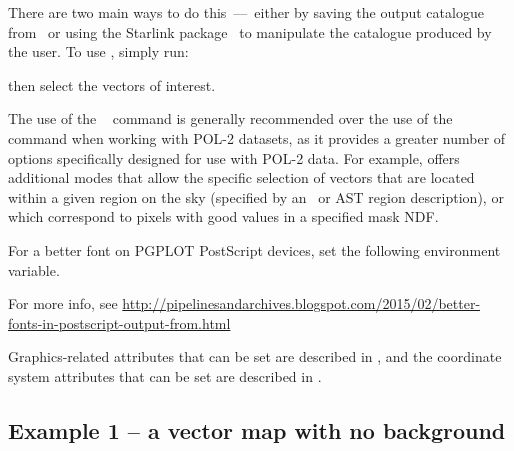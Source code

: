 There are two main ways to do this\ ---\ either by saving the output
catalogue from \GAIAref\ or using the Starlink package \POLPACKref\ to manipulate
the catalogue produced by the user.  To use \polpack, simply run:

\begin{terminalv}
\end{terminalv}

then select the vectors of interest.

\begin{terminalv}
\end{terminalv}

The use of the \POLPACKref\  command is
generally recommended over the use of the  
command when working with POL-2 datasets, as it provides a greater number of options
specifically designed for use with POL-2 data. For example,  offers
additional modes that allow the specific selection of vectors that are located within a given
region on the sky (specified by an \ARDref\ or AST region description), or which correspond to
pixels with good values in a specified mask NDF. 


\begin{tip}
  For a better font on PGPLOT PostScript devices, set the following
  environment variable.

\begin{terminalv}
\end{terminalv}

For more info, see
\url{http://pipelinesandarchives.blogspot.com/2015/02/better-fonts-in-postscript-output-from.html}

Graphics-related attributes that can be set are described in
, and the coordinate system attributes that can be set are
described in .
\end{tip}





\subsection{ Example 1 -- a vector map with no background}
\label{section:kappa-example1}

